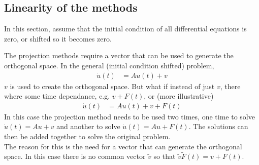 \subsection{Linearity of the methods} %
In this section, assume that the initial condition of all differential equations is zero, or shifted so it becomes zero. 

The projection methods require a vector that can be used to generate the orthogonal space. In the general (initial condition shifted) problem,
\begin{equation}
\begin{aligned}
\dot{u}(t) &= Au(t) + v
\end{aligned}
\end{equation} 
$v$ is used to create the orthogonal space. But what if instead of just $v$, there where some time dependance, e.g. $v + F(t)$, or (more illustrative)
\begin{equation}
\begin{aligned}
\dot{u}(t) &= Au(t) + v + F(t)
\end{aligned}
\end{equation} 
In this case the projection method needs to be used two times, one time to solve $ \dot{u}(t) = Au + v $ and another to solve $ \dot{u}(t) = Au + F(t) $. The solutions can then be added together to solve the original problem. \\
The reason for this is the need for a vector that can generate the orthogonal space. In this case there is no common vector $\tilde{v}$ so that $\tilde{v} \tilde{F}(t) = v + F(t)$. \\

